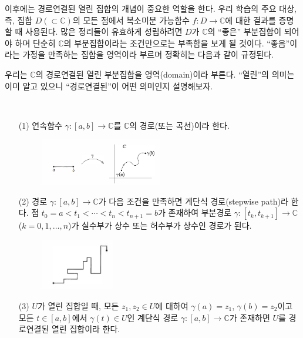 이후에는  경로연결된 열린 집합의 개념이 중요한 역할을 한다.
우리 학습의 주요 대상, 즉, 집합 $D(\subset \mathbb C)$의 모든 점에서
복소미분 가능함수 $f:D\to\mathbb C$에 대한 결과를 증명할 때 사용된다.
많은 정리들이 유효하게 성립하려면 $D$가 $\mathbb C$의 ``좋은'' 부분집합이 되어야 하며
단순히 $\mathbb C$의 부분집합이라는 조건만으로는 부족함을 보게 될 것이다.
``좋음''이라는 가정을 만족하는 집합을 영역이라 부르며 정확히는 다음과 같이 규정된다.

우리는 $\mathbb C$의 경로연결된 열린 부분집합을 영역(domain)이라 부른다.
``열린''의 의미는 이미 알고 있으니 ``경로연결된''이 어떤 의미인지 설명해보자.

\begin{salt_definition} \label{def-1-1}
\
\begin{itemize}
\item[(1)] 연속함수 $\gamma:[a,b] \to \mathbb C$를 $\mathbb C$의 경로(또는 곡선)이라 한다.
\begin{figure}[!h]
\begin{center}
\includegraphics[width=0.5\textwidth]{./SaltChapter/fig-1-0-2}
\end{center}
\end{figure}
\item[(2)] 경로 $\gamma:[a,b] \to \mathbb C$가 다음 조건을 만족하면 계단식 경로(stepwise path)라 한다.
점 $t_0 = a < t_1 < \cdots < t_n < t_{n+1} = b$가 존재하여
부분경로 $\gamma: [t_k, t_{k+1}] \to \mathbb C$ ($k=0,1,\ldots, n$)가
실수부가 상수 또는 허수부가 상수인 경로가 된다.
\begin{figure}[!h]
\begin{center}
\includegraphics[width=0.3\textwidth]{./SaltChapter/fig-1-0-3}
\end{center}
\end{figure}
\item[(3)] $U$가 열린 집합일 때,  모든 $z_1, z_2\in U$에 대하여
$\gamma(a)=z_1$, $\gamma(b)=z_2$이고 모든 $t\in[a,b]$에서 $\gamma(t)\in U$인
계단식 경로 $\gamma: [a,b] \to \mathbb C$가 존재하면
$U$를 경로연결된 열린 집합이라 한다.
\end{itemize}
\end{salt_definition}

